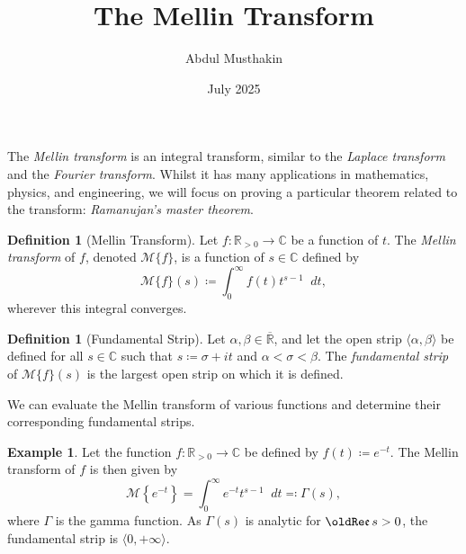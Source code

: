 \documentclass[a4paper]{article}
\title{The Mellin Transform}
\author{Abdul Musthakin}
\date{July 2025}
\newcommand*\diff{\mathop{}\!d} %
\newcommand{\R}{\mathbb{R}}
\newcommand{\C}{\mathbb{C}}
\renewcommand{\Re}{\mathop{\oldRe\mathfrak{e}}}
\theoremstyle{definition}
\newtheorem{definition}[theorem]{Definition}
\newtheorem{example}[theorem]{Example}
\begin{document}
\maketitle

The \emph{Mellin transform} is an integral transform, similar to the \emph{Laplace transform} and the \emph{Fourier transform}.
Whilst it has many applications in mathematics, physics, and engineering, we will focus on proving a particular theorem related to the transform: \emph{Ramanujan's master theorem}.
\begin{definition}[Mellin Transform]
    Let $f \colon \R_{>0} \to \C$ be a function of $t$.
    The \emph{Mellin transform} of $f$, denoted $\mathcal{M}\{f\}$, is a function of $s \in \C$ defined by
    \begin{equation}
        \mathcal{M}\{f\}(s) \coloneq \int_0^\infty f(t) t^{s-1} \diff t,
    \end{equation}
    wherever this integral converges.
\end{definition}
\begin{definition}[Fundamental Strip]
    Let $\alpha, \beta \in \overline{\R}$, and let the open strip $\langle \alpha, \beta\rangle$ be defined for all $s \in \C$ such that $s \coloneq \sigma + it$ and $\alpha < \sigma < \beta$.
    The \emph{fundamental strip} of $\mathcal{M} \{f\}(s)$ is the largest open strip on which it is defined.
\end{definition}
We can evaluate the Mellin transform of various functions and determine their corresponding fundamental strips.
\begin{example}
    Let the function $f \colon \R_{>0} \to \C$ be defined by $f(t) \coloneq e^{-t}$.
    The Mellin transform of $f$ is then given by
    \begin{equation*}
        \mathcal{M}\left\{e^{-t}\right\} = \int_0^\infty e^{-t} t^{s-1} \diff t \eqcolon \Gamma(s),
    \end{equation*}
    where $\Gamma$ is the gamma function.
    As $\Gamma(s)$ is analytic for $\Re s > 0$, the fundamental strip is $\langle 0, +\infty \rangle$.
\end{example}
\end{document}
